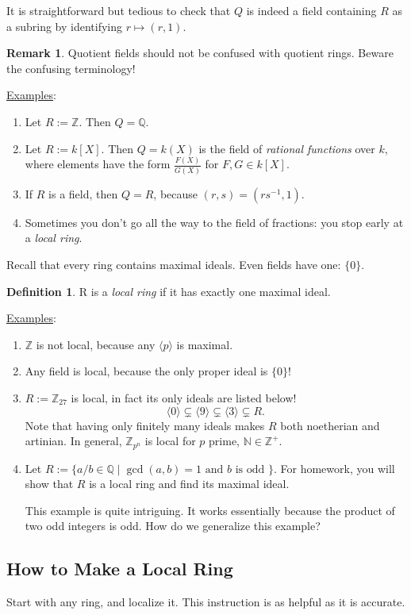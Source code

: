 \documentclass[12pt]{article}
\newcommand{\n}{\mathbb{N}}
\newcommand{\z}{\mathbb{Z}}
\newcommand{\q}{\mathbb{Q}}
\newcommand{\ita}[1]{\textit{#1}}
\newcommand{\vbrack}[1]{\langle #1\rangle}
\theoremstyle{definition}
\newtheorem{definition}[theorem]{Definition}
\newtheorem*{remark}{Remark}
\begin{document}
It is straightforward but tedious to check that $Q$ is indeed a field containing $R$ as a subring by identifying $r\mapsto(r,1)$.
\begin{remark}
    Quotient fields should not be confused with quotient rings. Beware the confusing terminology!
\end{remark}
\underline{Examples}:
\begin{enumerate}
    \item Let $R:=\z$. Then $Q=\q$.
    \item Let $R:=k[X]$. Then $Q=k(X)$ is the field of \ita{rational functions} over $k$, where elements have the form $\frac{F(X)}{G(X)}$ for $F,G\in k[X]$.
    \item If $R$ is a field, then $Q=R$, because $(r,s)=(rs^{-1},1)$.
    \item Sometimes you don't go all the way to the field of fractions: you stop early at a \ita{local ring}.
\end{enumerate}
Recall that every ring contains maximal ideals. Even fields have one: $\{0\}$.
\begin{definition}
    R is a \ita{local ring} if it has exactly one maximal ideal.
\end{definition}
\underline{Examples}:
\begin{enumerate}
    \item $\z$ is not local, because any $\vbrack{p}$ is maximal.
    \item Any field is local, because the only proper ideal is $\{0\}$!
    \item $R:=\z_{27}$ is local, in fact its only ideals are listed below!
    \[\vbrack{0}\subsetneq\vbrack{9}\subsetneq\vbrack{3}\subsetneq R.\]
    Note that having only finitely many ideals makes $R$ both noetherian and artinian. In general, $\z_{p^n}$ is local for $p$ prime, $\n\in\z^+$.
    \item Let $R:=\{a/b\in\q\mid\gcd(a,b)=1\text{ and }b\text{ is odd }\}$. For homework, you will show that $R$ is a local ring and find its maximal ideal.
    
    This example is quite intriguing. It works essentially because the product of two odd integers is odd. How do we generalize this example?
\end{enumerate}
\subsection{How to Make a Local Ring}
Start with any ring, and localize it. This instruction is as helpful as it is accurate.
\end{document}
